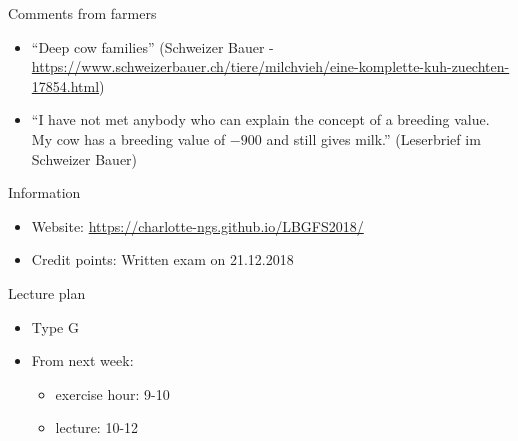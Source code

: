\documentclass[ignorenonframetext,]{beamer}
\providecommand{\tightlist}{%
  \setlength{\itemsep}{0pt}\setlength{\parskip}{0pt}}
\begin{document}
\begin{frame}{Comments from farmers}
\protect\hypertarget{comments-from-farmers}{}

\begin{itemize}
\tightlist
\item
  ``Deep cow families'' (Schweizer Bauer -
  \url{https://www.schweizerbauer.ch/tiere/milchvieh/eine-komplette-kuh-zuechten-17854.html})
\item
  ``I have not met anybody who can explain the concept of a breeding
  value. My cow has a breeding value of \(-900\) and still gives milk.''
  (Leserbrief im Schweizer Bauer)
\end{itemize}


\end{frame}

\begin{frame}{Information}
\protect\hypertarget{information}{}

\begin{itemize}
\tightlist
\item
  Website: \url{https://charlotte-ngs.github.io/LBGFS2018/}
\item
  Credit points: Written exam on 21.12.2018
\end{itemize}


\end{frame}

\begin{frame}{Lecture plan}
\protect\hypertarget{lecture-plan}{}

\begin{itemize}
\tightlist
\item
  Type G
\item
  From next week:

  \begin{itemize}
  \tightlist
  \item
    exercise hour: 9-10
  \item
    lecture: 10-12
  \end{itemize}
\end{itemize}


\end{frame}
\end{document}
